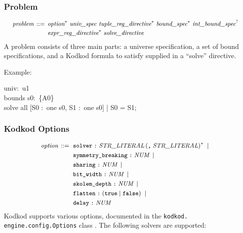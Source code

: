 \documentclass[a4paper,12pt]{article}
\begin{document}
    \subsubsection{Problem}
    \label{problem}

    $$\small\begin{aligned}
                \textit{problem} \,::=\, {}& \textit{option}^*\
                \textit{univ\_spec}\
                \textit{tuple\_reg\_directive}^*\
                \textit{bound\_spec}^*\
                \textit{int\_bound\_spec}^? \\[-.2ex] %
                & \textit{expr\_reg\_directive}^*\ \textit{solve\_directive}
    \end{aligned}$$
%
    A problem consists of three main parts: a universe specification, a set of bound
    specifications, and a Kodkod formula to satisfy supplied in a ``solve''
    directive.

    Example:

    \pre
    \ttfamily\small
    univ:~u1 \\
    bounds s0:~\{A0\} \\
    solve all [S0 :~one s0, S1 :~one s0] | S0 = S1;
    \post

    \subsubsection{Kodkod Options}
    \label{kodkod-options}

    $$\small\begin{aligned}
                \textit{option} \,::=\ {}& \texttt{solver}\; \verb|:|\; \textit{STR\_LITERAL}\, (\verb|,|\; \textit{STR\_LITERAL})^*\; \mid {} \\
                & \texttt{symmetry\_breaking}\; \verb|:|\; \textit{NUM}\; \mid \\
                & \texttt{sharing}\; \verb|:|\; \textit{NUM}\; \mid \\
                & \texttt{bit\_width}\; \verb|:|\; \textit{NUM}\; \mid \\
                & \texttt{skolem\_depth}\; \verb|:|\; \textit{NUM}\; \mid \\
                & \texttt{flatten}\; \verb|:|\; (\verb|true| \mid \verb|false|)\; \mid \\
                & \texttt{delay}\; \verb|:|\; \textit{NUM}
    \end{aligned}$$
%
    Kodkod supports various options, documented in the \texttt{kodkod.\allowbreak
    engine.\allowbreak config.\allowbreak Options} class \cite{kodkod-2009-options}.
    The following solvers are supported:
\end{document}
